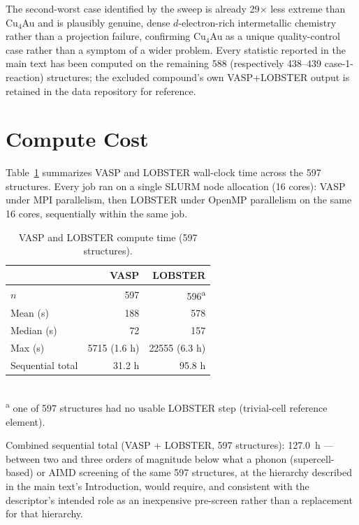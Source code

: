 \documentclass[11pt]{article}
\begin{document}
The second-worst case identified by the sweep is already 29$\times$ less
extreme than Cu$_4$Au and is plausibly genuine, dense $d$-electron-rich
intermetallic chemistry rather than a projection failure, confirming
Cu$_4$Au as a unique quality-control case rather than a symptom of a wider
problem. Every statistic reported in the main text has been computed on the
remaining 588 (respectively 438--439 case-1-reaction) structures; the
excluded compound's own VASP+LOBSTER output is retained in the data
repository for reference.

\section{Compute Cost}
\label{sec:si-cost}

Table~\ref{tab:si-cost} summarizes VASP and LOBSTER wall-clock time across
the 597 structures. Every job ran on a single SLURM node allocation (16
cores): VASP under MPI parallelism, then LOBSTER under OpenMP parallelism on
the same 16 cores, sequentially within the same job.

\begin{table}[htbp]
\centering
\caption{VASP and LOBSTER compute time (597 structures).}
\label{tab:si-cost}
\begin{tabular}{@{}lrr@{}}
\toprule
 & VASP & LOBSTER \\
\midrule
$n$ & 597 & 596\textsuperscript{a} \\
Mean (s) & 188 & 578 \\
Median (s) & 72 & 157 \\
Max (s) & 5715 (1.6 h) & 22555 (6.3 h) \\
Sequential total & 31.2 h & 95.8 h \\
\bottomrule
\end{tabular}
\vspace{0.15cm}
\\{\footnotesize \textsuperscript{a} one of 597 structures had no usable
LOBSTER step (trivial-cell reference element).}
\end{table}

Combined sequential total (VASP + LOBSTER, 597 structures): 127.0~h ---
between two and three orders of magnitude below what a phonon
(supercell-based) or AIMD screening of the same 597 structures, at the
hierarchy described in the main text's Introduction, would require, and
consistent with the descriptor's intended role as an inexpensive
pre-screen rather than a replacement for that hierarchy.
\end{document}
